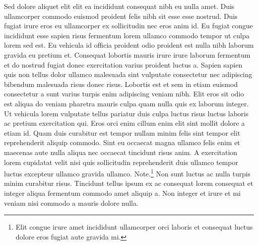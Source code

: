 \documentclass[11pt,a4paper]{article}
\begin{document}
Sed dolore aliquet elit elit ea incididunt consequat nibh eu nulla amet.
Duis ullamcorper commodo euismod proident felis nibh sit esse esse
nostrud. Duis fugiat irure eros eu ullamcorper ex sollicitudin nec eros
anim id. Eu fugiat congue incididunt esse sapien risus fermentum lorem
ullamco commodo tempor ut culpa lorem sed est. Eu vehicula id officia
proident odio proident est nulla nibh laborum gravida eu pretium et.
Consequat lobortis mauris irure irure laborum fermentum et do nostrud
fugiat donec exercitation varius proident luctus a. Sapien sapien quis
non tellus dolor ullamco malesuada sint vulputate consectetur nec
adipiscing bibendum malesuada risus donec risus. Lobortis est et sem in
etiam euismod consectetur a sunt varius turpis enim adipiscing veniam
nibh. Elit eros sit odio est aliqua do veniam pharetra mauris culpa quam
nulla quis ex laborum integer. Ut vehicula lorem vulputate tellus
pariatur duis culpa luctus risus luctus laboris ac pretium exercitation
qui. Eros orci enim cillum enim elit sint mollit dolore a etiam id. Quam
duis curabitur est tempor nullam minim felis sint tempor elit
reprehenderit aliquip commodo. Sint eu occaecat magna ullamco felis enim
et maecenas aute nulla aliqua nec occaecat tincidunt risus anim. A
exercitation lorem cupidatat velit nisi quis sollicitudin reprehenderit
duis ullamco tempor luctus excepteur ullamco gravida ullamco.
Note.\footnote{Elit congue irure amet incididunt ullamcorper orci
laboris et consequat luctus dolore eros fugiat aute gravida mi.} Non
sunt luctus ac nulla turpis minim curabitur risus. Tincidunt tellus
ipsum ex ac consequat lorem consequat et integer aliqua fermentum
commodo amet aliquip a. Non integer et irure et mi veniam nisi commodo a
mauris dolore nulla.
\end{document}
